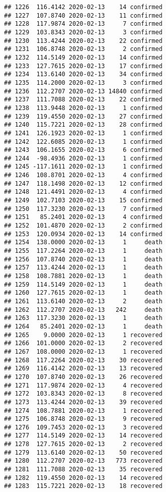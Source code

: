 \documentclass[
]{article}
\begin{document}
\begin{verbatim}
## 1226  116.4142 2020-02-13    14 confirmed
## 1227  107.8740 2020-02-13    11 confirmed
## 1228  117.9874 2020-02-13     7 confirmed
## 1229  103.8343 2020-02-13     3 confirmed
## 1230  113.4244 2020-02-13    22 confirmed
## 1231  106.8748 2020-02-13     2 confirmed
## 1232  114.5149 2020-02-13    14 confirmed
## 1233  127.7615 2020-02-13    17 confirmed
## 1234  113.6140 2020-02-13    34 confirmed
## 1235  114.2000 2020-02-13     3 confirmed
## 1236  112.2707 2020-02-13 14840 confirmed
## 1237  111.7088 2020-02-13    22 confirmed
## 1238  113.9448 2020-02-13     1 confirmed
## 1239  119.4550 2020-02-13    27 confirmed
## 1240  115.7221 2020-02-13    28 confirmed
## 1241  126.1923 2020-02-13     1 confirmed
## 1242  122.6085 2020-02-13     1 confirmed
## 1243  106.1655 2020-02-13     6 confirmed
## 1244  -98.4936 2020-02-13     1 confirmed
## 1245 -117.1611 2020-02-13     1 confirmed
## 1246  108.8701 2020-02-13     4 confirmed
## 1247  118.1498 2020-02-13    12 confirmed
## 1248  121.4491 2020-02-13     4 confirmed
## 1249  102.7103 2020-02-13    15 confirmed
## 1250  117.3230 2020-02-13     7 confirmed
## 1251   85.2401 2020-02-13     4 confirmed
## 1252  101.4870 2020-02-13     2 confirmed
## 1253  120.0934 2020-02-13    14 confirmed
## 1254  138.0000 2020-02-13     1     death
## 1255  117.2264 2020-02-13     1     death
## 1256  107.8740 2020-02-13     1     death
## 1257  113.4244 2020-02-13     1     death
## 1258  108.7881 2020-02-13     1     death
## 1259  114.5149 2020-02-13     1     death
## 1260  127.7615 2020-02-13     1     death
## 1261  113.6140 2020-02-13     2     death
## 1262  112.2707 2020-02-13   242     death
## 1263  117.3230 2020-02-13     1     death
## 1264   85.2401 2020-02-13     1     death
## 1265    9.0000 2020-02-13     1 recovered
## 1266  101.0000 2020-02-13     2 recovered
## 1267  108.0000 2020-02-13     1 recovered
## 1268  117.2264 2020-02-13    30 recovered
## 1269  116.4142 2020-02-13    13 recovered
## 1270  107.8740 2020-02-13    26 recovered
## 1271  117.9874 2020-02-13     4 recovered
## 1272  103.8343 2020-02-13     8 recovered
## 1273  113.4244 2020-02-13    39 recovered
## 1274  108.7881 2020-02-13     1 recovered
## 1275  106.8748 2020-02-13     9 recovered
## 1276  109.7453 2020-02-13     3 recovered
## 1277  114.5149 2020-02-13    14 recovered
## 1278  127.7615 2020-02-13     2 recovered
## 1279  113.6140 2020-02-13    50 recovered
## 1280  112.2707 2020-02-13   773 recovered
## 1281  111.7088 2020-02-13    35 recovered
## 1282  119.4550 2020-02-13    14 recovered
## 1283  115.7221 2020-02-13    18 recovered

\end{verbatim}
\end{document}
